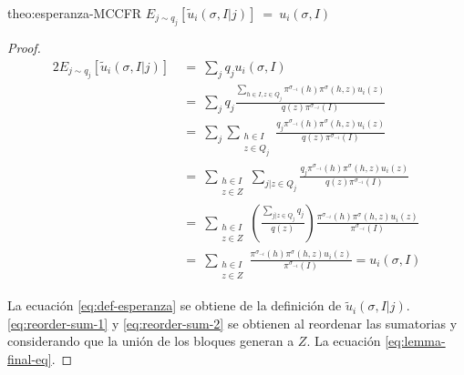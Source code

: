 \begin{reptheorem}{theo:esperanza-MCCFR}
$E_{j \sim q_j} [\tilde{u}_i(\sigma, I | j)]\ =\ u_i(\sigma, I)$
\end{reptheorem}

\begin{proof}
\begin{alignat}{2}
    E_{j \sim q_j}[\tilde{u}_i(\sigma, I | j)]\ & =\ \sum_{j} {q_j u_i(\sigma, I)} \\
    & =\ \sum_{j} { q_j \frac{\sum_{h \in I, z \in Q_j} \pi^{\sigma_{-i}}(h) \pi^{\sigma}(h, z) u_i(z)}{q(z) \pi^{\sigma_{-i}}(I)}} \\ \label{eq:def-esperanza}
    & =\ \sum_{j} \sum_{ \substack{h \in I \\ z \in Q_j}} \frac{q_j \pi^{\sigma_{-i}}(h) \pi^{\sigma}(h, z) u_i(z)}{ q(z) \pi^{\sigma_{-i}}(I)} \\ \label{eq:reorder-sum-1}
    & =\ \sum_{ \substack{h \in I \\ z \in Z} } \sum_{j | z \in Q_j} \frac{q_j \pi^{\sigma_{-i}}(h) \pi^{\sigma}(h, z) u_i(z)}{ q(z) \pi^{\sigma_{-i}}(I)} \\ \label{eq:reorder-sum-2}
    & =\ \sum_{ \substack{h \in I \\ z \in Z} } \left(\frac{\sum_{j | z \in Q_j} q_j }{q(z)}\right) \frac{\pi^{\sigma_{-i}}(h) \pi^{\sigma}(h, z) u_i(z)}{\pi^{\sigma_{-i}}(I)} \\
    & =\ \sum_{ \substack{h \in I \\ z \in Z} } \frac{\pi^{\sigma_{-i}}(h) \pi^{\sigma}(h, z) u_i(z)}{\pi^{\sigma_{-i}}(I)}  = u_i(\sigma, I) \label{eq:lemma-final-eq}
\end{alignat}

La ecuación \ref{eq:def-esperanza} se obtiene de la definición de $\tilde{u}_i(\sigma, I | j)$. \ref{eq:reorder-sum-1} y \ref{eq:reorder-sum-2} se obtienen al reordenar las sumatorias y considerando que la unión de los bloques generan a $Z$. La ecuación \ref{eq:lemma-final-eq}.
\end{proof}
